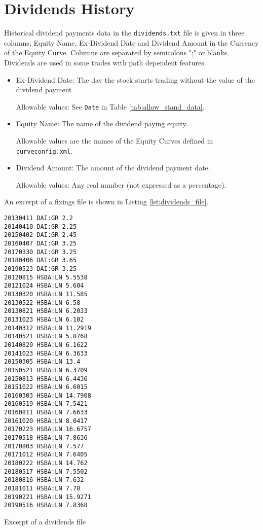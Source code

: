 \section{Dividends History}\label{sec:dividends}
Historical dividend payments data in the {\tt dividends.txt} file is given in three columns; Equity Name, Ex-Dividend Date and
Dividend Amount in the Currency of the Equity Curve. Columns are separated by semicolons ";" or blanks.
Dividends are used in some trades with path dependent features.

\begin{itemize}

\item Ex-Dividend Date: The day the stock starts trading without the value of the dividend payment

Allowable values:  See \lstinline!Date! in Table \ref{tab:allow_stand_data}.

\item Equity Name: The name of the dividend paying equity.

  Allowable values are the names of the Equity Curves defined in {\tt curveconfig.xml}.

\item Dividend Amount: The amount of the dividend payment
  date. 

  Allowable values: Any real number (not expressed as a percentage).
\end{itemize}

An excerpt of a fixings file is shown in Listing \ref{lst:dividends_file}.

\begin{listing}[H]
\begin{verbatim}
20130411 DAI:GR 2.2
20140410 DAI:GR 2.25
20150402 DAI:GR 2.45
20160407 DAI:GR 3.25
20170330 DAI:GR 3.25
20180406 DAI:GR 3.65
20190523 DAI:GR 3.25
20120815 HSBA:LN 5.5538
20121024 HSBA:LN 5.604
20130320 HSBA:LN 11.585
20130522 HSBA:LN 6.58
20130821 HSBA:LN 6.2033
20131023 HSBA:LN 6.102
20140312 HSBA:LN 11.2919
20140521 HSBA:LN 5.8768
20140820 HSBA:LN 6.1622
20141023 HSBA:LN 6.3633
20150305 HSBA:LN 13.4
20150521 HSBA:LN 6.3709
20150813 HSBA:LN 6.4436
20151022 HSBA:LN 6.6015
20160303 HSBA:LN 14.7908
20160519 HSBA:LN 7.5421
20160811 HSBA:LN 7.6633
20161020 HSBA:LN 8.0417
20170223 HSBA:LN 16.6757
20170518 HSBA:LN 7.8636
20170803 HSBA:LN 7.577
20171012 HSBA:LN 7.6405
20180222 HSBA:LN 14.762
20180517 HSBA:LN 7.5502
20180816 HSBA:LN 7.632
20181011 HSBA:LN 7.78
20190221 HSBA:LN 15.9271
20190516 HSBA:LN 7.8368
\end{verbatim}
\caption{Excerpt of a dividends file}
\label{lst:dividends_file}  
\end{listing}